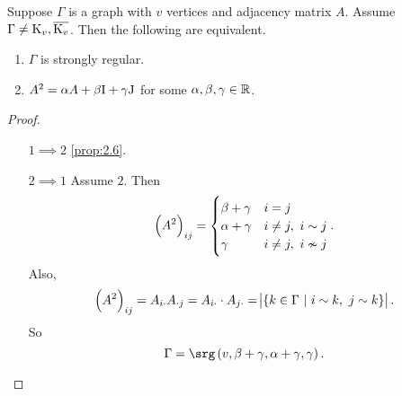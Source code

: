 \begin{proposition}
\label{prop:3.19}
Suppose $ \Gamma $ is a graph with $ v $ vertices and adjacency matrix $ A $. Assume $ \Gamma \ne \mathrm{K}_v, \overline{\mathrm{K}_v} $. Then the following are equivalent.
\begin{enumerate}
\item $ \Gamma $ is strongly regular.
\item $ A^2 = \alpha A + \beta\mathrm{I} + \gamma\mathrm{J} $ for some $ \alpha, \beta, \gamma \in \mathbb{R} $.
\end{enumerate}
\end{proposition}

\begin{proof}
\hfill
\begin{itemize}[leftmargin=0.5in]
\item[$ 1 \implies 2 $] \ref{prop:2.6}.
\item[$ 2 \implies 1 $] Assume $ 2 $. Then
$$ \br{A^2}_{ij} =
\begin{cases}
\beta + \gamma & i = j \\
\alpha + \gamma & i \ne j, \ i \sim j \\
\gamma & i \ne j, \ i \nsim j
\end{cases}.
$$
Also,
$$ \br{A^2}_{ij} = A_{i\cdot}A_{\cdot j} = A_{i \cdot} \cdot A_{j\cdot} = \abs{\cbr{k \in \Gamma \st i \sim k, \ j \sim k}}. $$
So
$$ \Gamma = \srg\br{v, \beta + \gamma, \alpha + \gamma, \gamma}. $$
\end{itemize}
\end{proof}

\pagebreak

